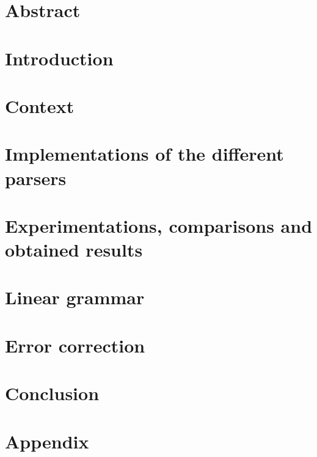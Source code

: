 \documentclass{report}
\begin{document}


\chapter*{Abstract}


\tableofcontents

\chapter*{Introduction}


\chapter{Context}


\chapter{Implementations of the different parsers}


\chapter{Experimentations, comparisons and obtained results}


\chapter{Linear grammar}


\chapter{Error correction}


\chapter*{Conclusion}


\listofalgorithms
{}

\listoffigures

\nocite{*}



\chapter*{Appendix}

\end{document}
